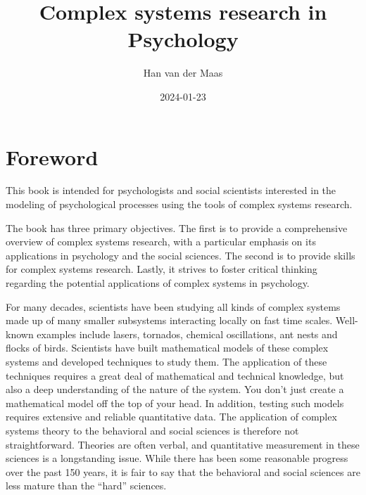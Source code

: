 \documentclass[
  a4paper,
  DIV=11,
  numbers=noendperiod,
  oneside]{scrreprt}
\title{Complex systems research in Psychology}
\author{Han van der Maas}
\date{2024-01-23}
\renewcommand*\contentsname{Table of contents}
\newcommand\contentsname{Table of contents}
\begin{document}
\maketitle
\ifdefined\Shaded\renewenvironment{Shaded}{\begin{tcolorbox}[interior hidden, borderline west={3pt}{0pt}{shadecolor}, frame hidden, boxrule=0pt, enhanced, breakable, sharp corners]}{\end{tcolorbox}}\fi

\renewcommand*\contentsname{Table of contents}
{
\hypersetup{linkcolor=}
\setcounter{tocdepth}{7}
\tableofcontents
}

\hypertarget{foreword}{%
\chapter*{Foreword}\label{foreword}}


This book is intended for psychologists and social scientists interested
in the modeling of psychological processes using the tools of complex
systems research.

The book has three primary objectives. The first is to provide a
comprehensive overview of complex systems research, with a particular
emphasis on its applications in psychology and the social sciences. The
second is to provide skills for complex systems research. Lastly, it
strives to foster critical thinking regarding the potential applications
of complex systems in psychology.

For many decades, scientists have been studying all kinds of complex
systems made up of many smaller subsystems interacting locally on fast
time scales. Well-known examples include lasers, tornados, chemical
oscillations, ant nests and flocks of birds. Scientists have built
mathematical models of these complex systems and developed techniques to
study them. The application of these techniques requires a great deal of
mathematical and technical knowledge, but also a deep understanding of
the nature of the system. You don't just create a mathematical model off
the top of your head. In addition, testing such models requires
extensive and reliable quantitative data. The application of complex
systems theory to the behavioral and social sciences is therefore not
straightforward. Theories are often verbal, and quantitative measurement
in these sciences is a longstanding issue. While there has been some
reasonable progress over the past 150 years, it is fair to say that the
behavioral and social sciences are less mature than the ``hard''
sciences.
\end{document}
